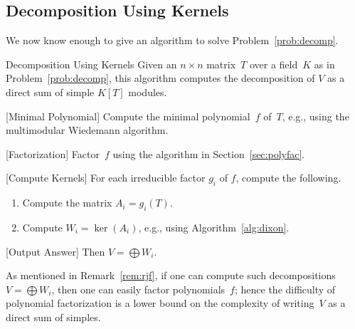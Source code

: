 \subsection{Decomposition Using Kernels}
We now know enough to give an algorithm to solve 
Problem~\ref{prob:decomp}.
\begin{algorithm}{Decomposition Using Kernels}\label{alg:decomp}%
Given an $n\times n$ matrix~$T$ over a field~$K$ as
in Problem~\ref{prob:decomp},
this algorithm computes the 
decomposition of $V$ as a direct sum of 
simple $K[T]$ modules.
\begin{steps}
\item{}[Minimal Polynomial] Compute the minimal polynomial~$f$ of~$T$,
e.g., using the multimodular Wiedemann algorithm.
\item{}[Factorization]\label{alg:decomp:factor} Factor~$f$ using the 
algorithm in Section~\ref{sec:polyfac}.
\item{}[Compute Kernels]\label{alg:decomp:ker}
For each irreducible factor $g_i$ of $f$, compute
the following.
\begin{enumerate}
\item Compute the matrix $A_i = g_i(T)$.  
\item Compute $W_i = \ker(A_i)$, e.g., using Algorithm~\ref{alg:dixon}.
\end{enumerate}
\item{}[Output Answer] Then $V=\bigoplus W_i$.
\end{steps}
\end{algorithm}

\begin{remark}
As mentioned in Remark~\ref{rem:rjf}, 
if one can compute such decompositions $V=\bigoplus W_i$, then
one can easily factor polynomials~$f$; hence the difficulty of
polynomial factorization
is a lower bound on the complexity of writing~$V$
as a direct sum of simples. 
\end{remark}






